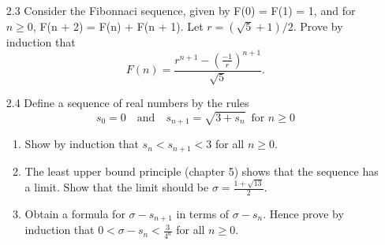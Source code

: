 \documentclass[11pt, oneside]{book}
\theoremstyle{break}
\begin{document}
\begin{enumerate}
	\item[2.3] Consider the Fibonnaci sequence, given by F(0) = F(1) = 1, and for $n \geq 0$, F(n + 2) = F(n) + F(n + 1). Let $r = (\sqrt{5} + 1)/2$. Prove by induction that
	\begin{equation*}
		F(n) = \frac{r^{n + 1} - (\frac{-1}{r})^{n + 1}}{\sqrt{5}}.
	\end{equation*}
	\item[2.4] Define a sequence of real numbers by the rules
	\begin{equation*}
		s_0 = 0 \quad \text{and} \quad s_{n + 1} = \sqrt{3 + s_n} \enspace \text{for } n \geq 0
	\end{equation*}
	\begin{enumerate}
		\item Show by induction that $s_n < s_{n + 1} < 3$ for all $n \geq 0$.
		\item The least upper bound principle (chapter 5) shows that the sequence has a limit. Show that the limit should be $\sigma = \frac{1 + \sqrt{13}}{2}.$
		\item Obtain a formula for $\sigma - s_{n + 1}$ in terms of $\sigma - s_n$. Hence prove by induction that $0 < \sigma - s_n < \frac{3}{4^n}$ for all $n \geq 0$.
	\end{enumerate}
\end{enumerate}
\end{document}
